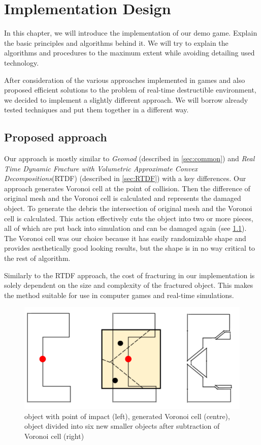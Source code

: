 \chapter{Implementation Design}
In this chapter, we will introduce the implementation of our demo game. Explain the basic principles and algorithms behind it. We will try to explain the algorithms and procedures to the maximum extent while avoiding detailing used technology.

After consideration of the various approaches implemented in games and also proposed efficient solutions to the problem of real-time destructible environment, we decided to implement a slightly different approach. We will borrow already tested techniques and put them together in a different way.

\section{Proposed approach}
Our approach is mostly similar to \emph{Geomod} (described in \cref{sec:common}) and \emph{Real Time Dynamic Fracture
with Volumetric Approximate Convex Decompositions}(RTDF) (described in \cref{sec:RTDF}) with a key differences. Our approach generates Voronoi cell at the point of collision. Then the difference of original mesh and the Voronoi cell is calculated and represents the damaged object. To generate the debris the intersection of original mesh and the Voronoi cell is calculated. This action effectively cuts the object into two or more pieces, all of which are put back into simulation and can be damaged again (see \cref{fig:subtraction}). The Voronoi cell was our choice because it has easily randomizable shape and provides aesthetically good looking results, but the shape is in no way critical to the rest of algorithm.

Similarly to the RTDF approach, the cost of fracturing in our implementation is solely dependent on the size and complexity of the fractured object.  This makes the method suitable for use in computer games and real-time simulations.

\begin{figure}
        \centering
        \includegraphics[width=\textwidth]{img/subtractionProcess}
        \caption{object with point of impact (left), generated Voronoi cell (centre), object divided into six new smaller objects after subtraction of Voronoi cell (right)}
        \label{fig:subtraction}
\end{figure}

